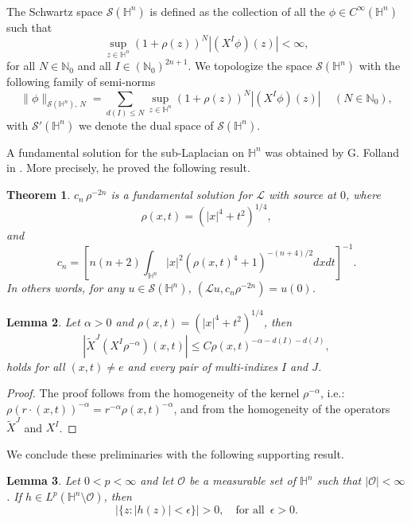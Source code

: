 \documentclass[reqno,10pt]{article}
\newtheorem{theorem}{Theorem}
\newtheorem{lemma}[theorem]{Lemma}
\theoremstyle{definition}
\numberwithin{equation}{section}
\numberwithin{theorem}{section}
\begin{document}
\

The Schwartz space $\mathcal{S}(\mathbb{H}^{n})$ is defined as the collection of all the $\phi \in C^{\infty}(\mathbb{H}^{n})$ such that
\[
\sup_{z \in \mathbb{H}^{n}} (1+\rho(z))^{N} |(X^{I} \phi)(z)| < \infty,
\]
for all $N \in \mathbb{N}_{0}$ and all $I \in (\mathbb{N}_{0})^{2n+1}$. We topologize the space $\mathcal{S}(\mathbb{H}^{n})$ with the following family of semi-norms
\[
\| \phi \|_{\mathcal{S}(\mathbb{H}^{n}), \, N} = \sum_{d(I) \leq N} \sup_{z \in \mathbb{H}^{n}} (1+\rho(z))^{N} |(X^{I} \phi)(z)| \,\,\,\,\,\,\, (N \in \mathbb{N}_{0}),
\]
with $\mathcal{S}'(\mathbb{H}^{n})$ we denote the dual space of $\mathcal{S}(\mathbb{H}^{n})$. 
 

\bigskip

A fundamental solution for the sub-Laplacian on $\mathbb{H}^n$ was obtained by G. Folland in \cite{Folland}. More precisely, he proved the following result.

\begin{theorem} \label{fund solution}
$c_n \, \rho^{-2n}$ is a fundamental solution for $\mathcal{L}$ with source at $0$, where
\[
\rho(x,t) = (|x|^4 + t^2)^{1/4},
\]
and
\[
c_n = \left[ n(n+2) \int_{\mathbb{H}^n} |x|^2 (\rho(x,t)^4 + 1)^{-(n+4)/2} dxdt \right]^{-1}.
\]
In others words, for any $u \in \mathcal{S}(\mathbb{H}^{n})$, $\left( \mathcal{L}u,  c_n \rho^{-2n} \right) = u(0)$.
\end{theorem}

\begin{lemma} \label{ro estimate} Let $\alpha > 0$ and $\rho(x,t) = (|x|^4 + t^2)^{1/4}$, then 
\[
\left| \widetilde{X}^{J} \left( X^{I} \rho^{-\alpha} \right)(x,t) \right| \leq C \rho(x,t)^{-\alpha - d(I) - d(J)},
\]
holds for all $(x,t) \neq e$ and every pair of multi-indixes $I$ and $J$.
\end{lemma}

\begin{proof}
The proof follows from the homogeneity of the kernel $\rho^{-\alpha}$, i.e.: 
$\rho(r \cdot (x,t))^{-\alpha} = r^{-\alpha} \rho(x,t)^{-\alpha}$, and from the homogeneity of the operators $\widetilde{X}^{J}$ and $X^{I}$.
\end{proof}

We conclude these preliminaries with the following supporting result.

\begin{lemma} \label{finite measure}
Let $0 < p < \infty$ and let $\mathcal{O}$ be a measurable set of $\mathbb{H}^n$ such that $|\mathcal{O}| < \infty$. If 
$h \in L^p(\mathbb{H}^n \setminus \mathcal{O})$, then
\[
|\{ z : |h(z)| < \epsilon\}| > 0, \,\,\,\,\,\, \text{for all} \,\,\, \epsilon > 0.
\]
\end{lemma}
\end{document}
